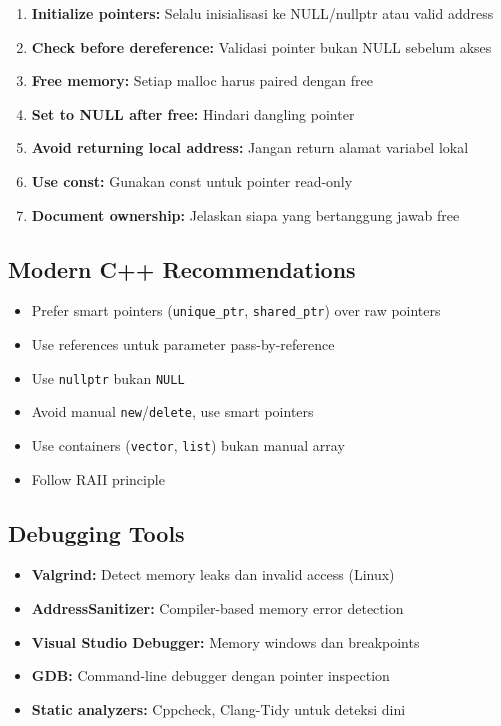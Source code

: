\documentclass[../main.tex]{subfiles}
\begin{document}
\begin{enumerate}
  \item \textbf{Initialize pointers:} Selalu inisialisasi ke NULL/nullptr atau valid address
  \item \textbf{Check before dereference:} Validasi pointer bukan NULL sebelum akses
  \item \textbf{Free memory:} Setiap malloc harus paired dengan free
  \item \textbf{Set to NULL after free:} Hindari dangling pointer
  \item \textbf{Avoid returning local address:} Jangan return alamat variabel lokal
  \item \textbf{Use const:} Gunakan const untuk pointer read-only
  \item \textbf{Document ownership:} Jelaskan siapa yang bertanggung jawab free
\end{enumerate}

\subsection{Modern C++ Recommendations}

\begin{itemize}
  \item Prefer smart pointers (\texttt{unique\_ptr}, \texttt{shared\_ptr}) over raw pointers
  \item Use references untuk parameter pass-by-reference
  \item Use \texttt{nullptr} bukan \texttt{NULL}
  \item Avoid manual \texttt{new}/\texttt{delete}, use smart pointers
  \item Use containers (\texttt{vector}, \texttt{list}) bukan manual array
  \item Follow RAII principle
\end{itemize}

\subsection{Debugging Tools}

\begin{itemize}
  \item \textbf{Valgrind:} Detect memory leaks dan invalid access (Linux) \parencite{valgrind}
  \item \textbf{AddressSanitizer:} Compiler-based memory error detection \parencite{addresssanitizer}
  \item \textbf{Visual Studio Debugger:} Memory windows dan breakpoints
  \item \textbf{GDB:} Command-line debugger dengan pointer inspection
  \item \textbf{Static analyzers:} Cppcheck, Clang-Tidy untuk deteksi dini
\end{itemize}
\end{document}
